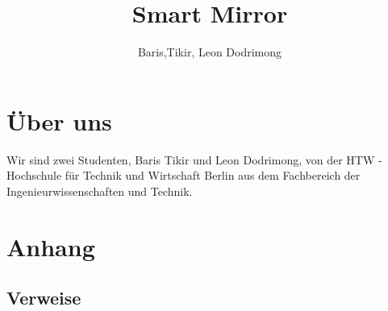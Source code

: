 \documentclass[a4paper,11pt]{article}
\author{Baris,Tikir, Leon Dodrimong}
\title{Smart Mirror}
\begin{document}
\maketitle
\newpage
\tableofcontents
\newpage












\section{Über uns}
Wir sind zwei Studenten, Baris Tikir und Leon Dodrimong, von der HTW - Hochschule für
Technik und Wirtschaft Berlin aus dem Fachbereich der Ingenieurwissenschaften und
Technik. 


\section{Anhang}
\subsection{Verweise}
\end{document}
